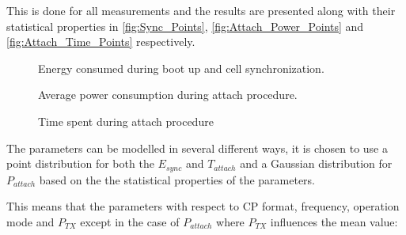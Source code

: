 This is done for all measurements and the results are presented along with their statistical properties in \autoref{fig:Sync_Points}, \autoref{fig:Attach_Power_Points} and \autoref{fig:Attach_Time_Points} respectively.

\begin{figure}[H]
\centering
\begin{minipage}{0.48\textwidth}
\resizebox{\textwidth}{!}{
}
\end{minipage}
\hfill
\begin{minipage}{0.48\textwidth}
\resizebox{\textwidth}{!}{
}
\end{minipage}
\caption{Energy consumed during boot up and cell synchronization.}
\label{fig:Sync_Points}
\end{figure}

\begin{figure}[H]
\centering
\begin{minipage}{0.48\textwidth}
\resizebox{\textwidth}{!}{
}
\end{minipage}
\hfill
\begin{minipage}{0.48\textwidth}
\resizebox{\textwidth}{!}{
}
\end{minipage}
\caption{Average power consumption during attach procedure.}
\label{fig:Attach_Power_Points}
\end{figure}

\begin{figure}[H]
\centering
\begin{minipage}{0.48\textwidth}
\resizebox{\textwidth}{!}{
}
\end{minipage}
\hfill
\begin{minipage}{0.48\textwidth}
\resizebox{\textwidth}{!}{
}
\end{minipage}
\caption{Time spent during attach procedure}
\label{fig:Attach_Time_Points}
\end{figure}


The parameters can be modelled in several different ways, it is chosen to use a point distribution for both the $E_{sync}$ and $T_{attach}$ and a Gaussian distribution for $P_{attach}$ based on the the statistical properties of the parameters. 

This means that the parameters with respect to CP format, frequency, operation mode and $P_{TX}$ except in the case of $P_{attach}$ where $P_{TX}$ influences the mean value:

